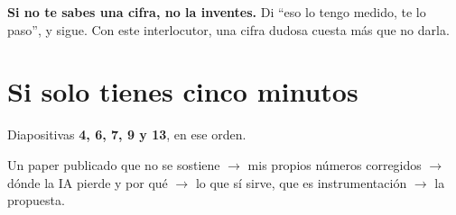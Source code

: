 \documentclass[11pt,a4paper]{article}
\begin{document}
\textbf{Si no te sabes una cifra, no la inventes.} Di ``eso lo tengo medido, te lo paso'',
y sigue. Con este interlocutor, una cifra dudosa cuesta más que no darla.

\section*{Si solo tienes cinco minutos}

Diapositivas \textbf{4, 6, 7, 9 y 13}, en ese orden.

Un paper publicado que no se sostiene $\rightarrow$ mis propios números corregidos
$\rightarrow$ dónde la IA pierde y por qué $\rightarrow$ lo que sí sirve, que es
instrumentación $\rightarrow$ la propuesta.
\end{document}
